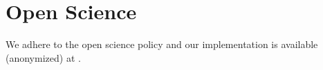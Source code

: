 \section{Open Science}
%
We adhere to the open science policy and our implementation is available (anonymized) at \cite{code}. 




%




%
%
%
%
%


